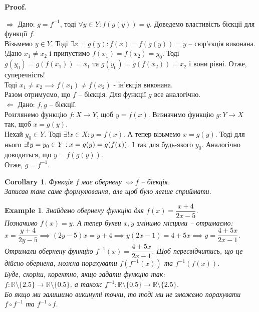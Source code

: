 \documentclass[a4paper, 14pt]{extarticle}
\makeatletter
\def\rightproof{$\boxed{\Rightarrow}$ }
\def\leftproof{$\boxed{\Leftarrow}$ }
\theoremstyle{theoremdd}
\theoremstyle{theoremdd}
\theoremstyle{theoremdd}
\theoremstyle{theoremdd}
\theoremstyle{theoremdd}
\newtheorem{example}[theorem]{Example}
\theoremstyle{theoremdd}
\theoremstyle{theoremdd}
\theoremstyle{theoremdd}
\theoremstyle{theoremdd}
\theoremstyle{theoremdd}
\theoremstyle{theoremdd}
\theoremstyle{theoremdd}
\theoremstyle{theoremdd}
\theoremstyle{theoremdd}
\newtheorem{corollary}[theorem]{Corollary}
\theoremstyle{theoremdd}
\renewenvironment{proof}[1][Proof.\\]{\par
\pushQED{\hfill \qed}%
\normalfont \topsep6\p@\@plus6\p@\relax
\trivlist
\item\relax
{\bfseries
#1\@addpunct{.}}\hspace\labelsep\ignorespaces
}{%
\popQED\endtrivlist\@endpefalse
}
\makeatother
\begin{document}
	\begin{proof}
	\rightproof Дано: $g = f^{-1}$, тоді $\forall y \in Y: f(g(y)) = y$. Доведемо  властивість бієкції для функції $f$.\\
	Візьмемо $y \in Y$. Тоді $\exists x = g(y): f(x) = f(g(y)) = y$ -- сюр'єкція виконана.\\
	!Дано $x_1 \neq x_2$ і припустимо $f(x_1) = f(x_2) = y_0$. Тоді $g(y_0) = g(f(x_1)) = x_1$ та $g(y_0) = g(f(x_2)) = x_2$ і вони рівні. Отже, суперечність!\\ Тоді $x_1 \neq x_2 \implies f(x_1) \neq f(x_2)$ - ін'єкція виконана.\\
	Разом отримуємо, що $f$ -- бієкція. Для функції $g$ все аналогічно.
	\bigskip \\
	\leftproof Дано: $f,g$ -- бієкції.\\
	Розглянемо функцію $f \colon X \to Y$, щоб $y = f(x)$. Визначимо функцію $g \colon Y \to X$ так, щоб $x = g(y)$.\\
	Нехай $y_0 \in Y$. Тоді $\exists! x \in X: y = f(x)$. А тепер візьмемо $x = g(y)$. Тоді для нього $\exists! y = y_0 \in Y: \\ x = g(y) = g(f(x))$. І так для будь-якого $y_0$. Аналогічно доводиться, що $y = f(g(y))$.\\
	Отже, $g = f^{-1}$.
	\end{proof}
	
	\begin{corollary}
	Функція $f$ має обернену $\iff f $ -- бієкція.\\
	\textit{Записав таке саме формулювання, але щоб було легше сприймати.}
	\end{corollary}
	
	\begin{example} Знайдемо обернену функцію для $f(x) = \dfrac{x+4}{2x-5}$.\\
	Позначимо $f(x) = y$. А тепер букви $x,y$ змінимо місцями -- отримаємо:\\
	$x = \dfrac{y+4}{2y-5} \implies (2y-5)x = y+4 \implies y(2x-1) = 4+5x \implies y = \dfrac{4+5x}{2x-1}$.\\
	Отримали обернену функцію $f^{-1}(x) = \dfrac{4+5x}{2x-1}$.	Щоб пересвідчитись, що це дійсно обернена, можна порахувати $f(f^{-1}(x))$ та $f^{-1}(f(x))$.
	\bigskip \\
	Буде, скоріш, коректно, якщо задати функцію так: \\ $f \colon \mathbb{R} \setminus \{2.5\} \to \mathbb{R} \setminus \{0.5\}$, а також $f^{-1} \colon \mathbb{R} \setminus \{0.5\} \to \mathbb{R} \setminus \{2.5\}$.\\ 
	Бо якщо ми залишимо викинуті точки, то тоді ми не зможемо порахувати $f \circ f^{-1}$ та $f^{-1} \circ f$.
	\end{example}
	
\end{document}
